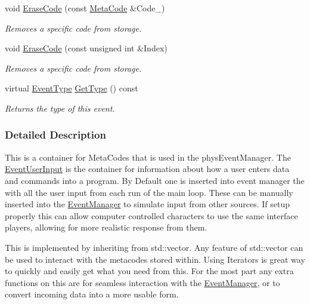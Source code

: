 \begin{DoxyCompactItemize}
void \hyperlink{classphys_1_1EventUserInput_a34c05a76a790435799441da75a83fa9c}{EraseCode} (const \hyperlink{classphys_1_1MetaCode}{MetaCode} \&Code\_\-)
\begin{DoxyCompactList}\small\item\em Removes a specific code from storage. \item\end{DoxyCompactList}\item 
void \hyperlink{classphys_1_1EventUserInput_a583084578443019d6e286b8f0e02ce58}{EraseCode} (const unsigned int \&Index)
\begin{DoxyCompactList}\small\item\em Removes a specific code from storage. \item\end{DoxyCompactList}\item 
virtual \hyperlink{classphys_1_1EventBase_a5e6a8564e127f654123f0bf6a2751923}{EventType} \hyperlink{classphys_1_1EventUserInput_a3e803a8d9bcc1576fe04d2245a86ec80}{GetType} () const 
\begin{DoxyCompactList}\small\item\em Returns the type of this event. \item\end{DoxyCompactList}\end{DoxyCompactItemize}


\subsubsection{Detailed Description}
This is a container for MetaCodes that is used in the physEventManager. The \hyperlink{classphys_1_1EventUserInput}{EventUserInput} is the container for information about how a user enters data and commands into a program. By Default one is inserted into event manager the with all the user input from each run of the main loop. These can be manually inserted into the \hyperlink{classphys_1_1EventManager}{EventManager} to simulate input from other sources. If setup properly this can allow computer controlled characters to use the same interface players, allowing for more realistic response from them. \par
 \par
 This is implemented by inheriting from std::vector. Any feature of std::vector can be used to interact with the metacodes stored within. Using Iterators is great way to quickly and easily get what you need from this. For the most part any extra functions on this are for seamless interaction with the \hyperlink{classphys_1_1EventManager}{EventManager}, or to convert incoming data into a more usable form. 

